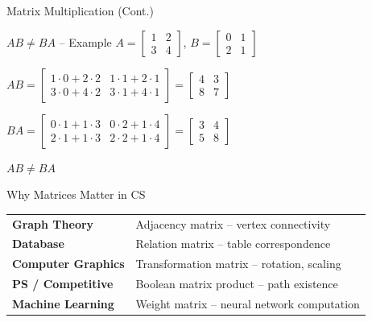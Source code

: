 \documentclass{beamer}
\begin{document}
\begin{frame}[t]{Matrix Multiplication (Cont.)}
    \small
    \vspace{0.1cm}
    \begin{block}{$AB \neq BA$ -- Example}
        \footnotesize
        $A = \begin{bmatrix}1&2\\3&4\end{bmatrix}$, \quad
        $B = \begin{bmatrix}0&1\\2&1\end{bmatrix}$

        \vspace{0.15cm}
        $AB = \begin{bmatrix}1 \cdot 0 + 2 \cdot 2 & 1 \cdot 1 + 2 \cdot 1\\3 \cdot 0 + 4 \cdot 2 & 3 \cdot 1 + 4 \cdot 1\end{bmatrix} = \begin{bmatrix}4&3\\8&7\end{bmatrix}$

        \vspace{0.1cm}
        $BA = \begin{bmatrix}0 \cdot 1 + 1 \cdot 3 & 0 \cdot 2 + 1 \cdot 4\\2 \cdot 1 + 1 \cdot 3 & 2 \cdot 2 + 1 \cdot 4\end{bmatrix} = \begin{bmatrix}3&4\\5&8\end{bmatrix}$

        \vspace{0.1cm}
        $AB \neq BA$ \quad \checkmark
    \end{block}

    \vspace{0.15cm}
    \begin{exampleblock}{Why Matrices Matter in CS}
        \footnotesize
        \renewcommand{\arraystretch}{1.3}
        \begin{tabular}{ll}
            \textbf{Graph Theory} & Adjacency matrix -- vertex connectivity \\
            \textbf{Database} & Relation matrix -- table correspondence \\
            \textbf{Computer Graphics} & Transformation matrix -- rotation, scaling \\
            \textbf{PS / Competitive} & Boolean matrix product -- path existence \\
            \textbf{Machine Learning} & Weight matrix -- neural network computation \\
        \end{tabular}
        \renewcommand{\arraystretch}{1}
    \end{exampleblock}
\end{frame}
\end{document}
